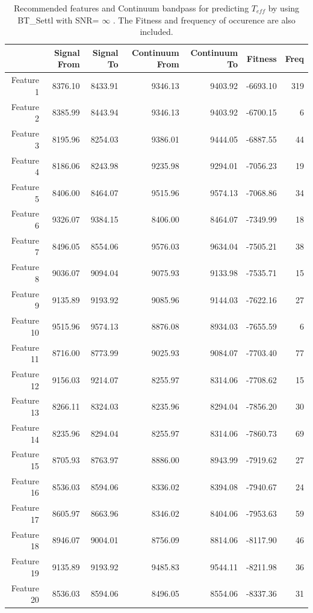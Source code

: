 {{\begin{table}
\begin{center}
\begin{tabular}{rrrrrrr}
  \hline
 & Signal From & Signal To & Continuum From & Continuum To & Fitness & Freq \\ 
  \hline
Feature 1 & 8376.10 & 8433.91 & 9346.13 & 9403.92 & -6693.10 & 319 \\ 
  Feature 2 & 8385.99 & 8443.94 & 9346.13 & 9403.92 & -6700.15 &   6 \\ 
  Feature 3 & 8195.96 & 8254.03 & 9386.01 & 9444.05 & -6887.55 &  44 \\ 
  Feature 4 & 8186.06 & 8243.98 & 9235.98 & 9294.01 & -7056.23 &  19 \\ 
  Feature 5 & 8406.00 & 8464.07 & 9515.96 & 9574.13 & -7068.86 &  34 \\ 
  Feature 6 & 9326.07 & 9384.15 & 8406.00 & 8464.07 & -7349.99 &  18 \\ 
  Feature 7 & 8496.05 & 8554.06 & 9576.03 & 9634.04 & -7505.21 &  38 \\ 
  Feature 8 & 9036.07 & 9094.04 & 9075.93 & 9133.98 & -7535.71 &  15 \\ 
  Feature 9 & 9135.89 & 9193.92 & 9085.96 & 9144.03 & -7622.16 &  27 \\ 
  Feature 10 & 9515.96 & 9574.13 & 8876.08 & 8934.03 & -7655.59 &   6 \\ 
  Feature 11 & 8716.00 & 8773.99 & 9025.93 & 9084.07 & -7703.40 &  77 \\ 
  Feature 12 & 9156.03 & 9214.07 & 8255.97 & 8314.06 & -7708.62 &  15 \\ 
  Feature 13 & 8266.11 & 8324.03 & 8235.96 & 8294.04 & -7856.20 &  30 \\ 
  Feature 14 & 8235.96 & 8294.04 & 8255.97 & 8314.06 & -7860.73 &  69 \\ 
  Feature 15 & 8705.93 & 8763.97 & 8886.00 & 8943.99 & -7919.62 &  27 \\ 
  Feature 16 & 8536.03 & 8594.06 & 8336.02 & 8394.08 & -7940.67 &  24 \\ 
  Feature 17 & 8605.97 & 8663.96 & 8346.02 & 8404.06 & -7953.63 &  59 \\ 
  Feature 18 & 8946.07 & 9004.01 & 8756.09 & 8814.06 & -8117.90 &  46 \\ 
  Feature 19 & 9135.89 & 9193.92 & 9485.83 & 9544.11 & -8211.98 &  36 \\ 
  Feature 20 & 8536.03 & 8594.06 & 8496.05 & 8554.06 & -8337.36 &  31 \\ 
   \hline
\end{tabular}
\caption {Recommended features and Continuum bandpass for predicting $ T_{eff} $ 
      by using BT\_Settl with SNR= $ {\infty} $ . 
      The Fitness and frequency of occurence are also included.} \label{tab:tab_NC_T} 
\end{center}
\end{table}

}}
